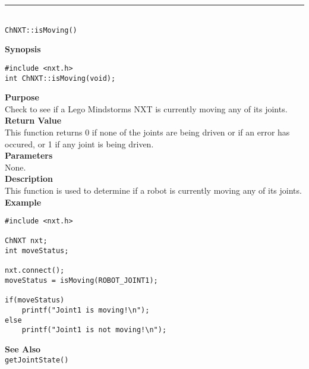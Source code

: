 \noindent
\vspace{5pt}
\rule{4.5in}{0.015in}\\
\noindent
{\LARGE \texttt{ChNXT::isMoving()} }\\


\noindent
{\bf Synopsis}
\vspace{-8pt}
\begin{verbatim}
#include <nxt.h>
int ChNXT::isMoving(void);
\end{verbatim}

\noindent
{\bf Purpose}\\
Check to see if a Lego Mindstorms NXT is currently moving any of its joints.\\

\noindent
{\bf Return Value}\\
This function returns 0 if none of the joints are being driven or 
if an error has occured, or 1 if any joint is being driven.\\

\noindent
{\bf Parameters}\\
None.\\

\noindent
{\bf Description}\\
This function is used to determine if a robot is currently moving any of its joints.\\

\noindent
{\bf Example}
\begin{verbatim}
#include <nxt.h>

ChNXT nxt;
int moveStatus;

nxt.connect();
moveStatus = isMoving(ROBOT_JOINT1);

if(moveStatus)
    printf("Joint1 is moving!\n");
else
    printf("Joint1 is not moving!\n");
\end{verbatim}

\noindent
{\bf See Also}\\
\texttt{getJointState()}\\
